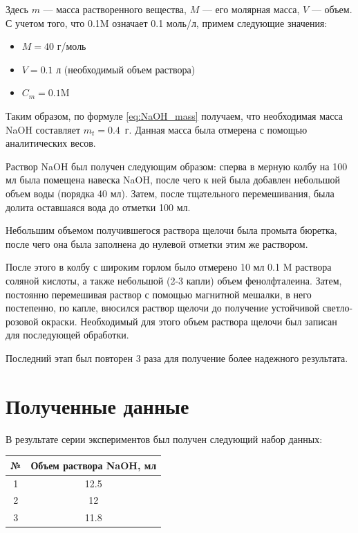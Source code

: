 \documentclass[a4paper, 12pt]{article}
\begin{document}
Здесь $m$ --- масса растворенного вещества, $M$ --- его молярная масса, $V$ --- объем. С учетом того, что 0.1M означает 0.1 моль/л, примем следующие значения:

\begin{itemize}
	\item $M = 40$ г/моль 
	
	\item $V = 0.1$ л (необходимый объем раствора)
	
	\item $C_m = 0.1 \text{M}$
\end{itemize}

Таким образом, по формуле \ref{eq:NaOH_mass} получаем, что необходимая масса NaOH составляет $m_t = 0.4$~г. Данная масса была отмерена с помощью аналитических весов.

Раствор NaOH был получен следующим образом: сперва в мерную колбу на 100 мл была помещена навеска NaOH, после чего к ней была добавлен небольшой объем воды (порядка 40 мл). Затем, после тщательного перемешивания, была долита оставшаяся вода до отметки 100 мл.

Небольшим объемом получившегося раствора щелочи была промыта бюретка, после чего она была заполнена до нулевой отметки этим же раствором.

После этого в колбу с широким горлом было отмерено 10 мл 0.1 M раствора соляной кислоты, а также небольшой (2-3 капли) объем фенолфталеина. Затем, постоянно перемешивая раствор с помощью магнитной мешалки, в него постепенно, по капле, вносился раствор щелочи до получение устойчивой светло-розовой окраски. Необходимый для этого объем раствора щелочи был записан для последующей обработки. 

Последний этап был повторен 3 раза для получение более надежного результата.

\section{Полученные данные}

В результате серии экспериментов был получен следующий набор данных:

\begin{center}
	
	\begin{tabular}{|c|c|}
		\hline
		№ & Объем раствора NaOH, мл \\
		\hline
		1 & 12.5 \\
		\hline
		2 & 12 \\
		\hline
		3 & 11.8 \\
		\hline
	\end{tabular}

\end{center}
\end{document}
